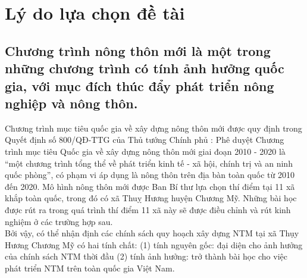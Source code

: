 \documentclass[../thesis.tex]{subfiles}
\begin{document}
\section{Lý do lựa chọn đề tài}
\subsection{Chương trình nông thôn mới là một trong những chương trình có tính ảnh hưởng quốc gia, với mục đích thúc đẩy phát triển nông nghiệp và nông thôn.}
Chương trình mục tiêu quốc gia về xây dựng nông thôn mới được quy định trong Quyết định số 800/QĐ-TTG của Thủ tướng Chính phủ : Phê duyệt Chương trình mục tiêu Quốc gia về xây dựng nông thôn mới giai đoạn 2010 - 2020 là “một chương trình tổng thể về phát triển kinh tế - xã hội, chính trị và an ninh quốc phòng”, có phạm vi áp dụng là nông thôn trên địa bàn toàn quốc từ 2010 đến 2020. Mô hình nông thôn mới được Ban Bí thư lựa chọn thí điểm tại 11 xã khắp toàn quốc, trong đó có xã Thuỵ Hương huyện Chương Mỹ. Những bài học được rút ra trong quá trình thí điểm 11 xã này sẽ được điều chỉnh và rút kinh nghiệm ở các trường hợp sau.\\ 
Bởi vậy, có thể nhận định các chính sách quy hoạch xây dựng NTM tại xã Thụy Hương Chương Mỹ có hai tính chất: (1) tính nguyên gốc: đại diện cho ảnh hưởng của chính sách NTM thời đầu (2) tính ảnh hưởng: trở thành bài học cho việc  phát triển NTM trên toàn quốc gia Việt Nam.
\end{document}
